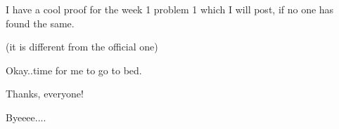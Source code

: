 I have a cool proof for the week 1 problem 1 which I will post, if no one has found the same.

(it is different from the official one)





Okay..time for me to go to bed.





Thanks, everyone!

Byeeee.... 

